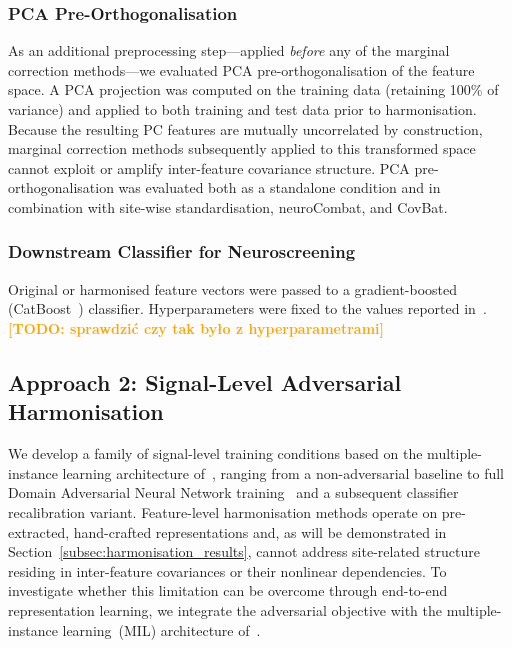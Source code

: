 \documentclass[preprint,12pt]{elsarticle}
\newcommand{\td}[1]{\textcolor{orange}{\textbf{[TODO: #1]}}}
\begin{document}
\subsubsection{PCA Pre-Orthogonalisation}
\label{subsubsec:pca}

As an additional preprocessing step---applied \emph{before} any of
the marginal correction methods---we evaluated PCA
pre-orthogonalisation of the feature space.
A PCA projection was computed on the training data (retaining 100\%
of variance) and applied to both training and test data prior to
harmonisation.
Because the resulting PC features are mutually uncorrelated by
construction, marginal correction methods subsequently applied to
this transformed space cannot exploit or amplify inter-feature
covariance structure.
PCA pre-orthogonalisation was evaluated both as a standalone
condition and in combination with site-wise standardisation,
neuroCombat, and CovBat.

\subsubsection{Downstream Classifier for Neuroscreening}
\label{subsubsec:classifier}

Original or harmonised feature vectors were passed to a
gradient-boosted (CatBoost~\cite{prokhorenkova2018catboost})
classifier.
Hyperparameters were fixed to the values reported
in~\cite{poziomska2026quantity}.
\td{sprawdzić czy tak było z hyperparametrami}

\subsection{Approach 2: Signal-Level Adversarial Harmonisation}
\label{sec:approach2}

We develop a family of signal-level training conditions based on the
multiple-instance learning architecture of~\cite{poziomska2026quantity},
ranging from a non-adversarial baseline to full Domain Adversarial
Neural Network training~\cite{ganin2016domain} and a subsequent
classifier recalibration variant.
Feature-level harmonisation methods operate on pre-extracted,
hand-crafted representations and, as will be demonstrated in
Section~\ref{subsec:harmonisation_results}, cannot address
site-related structure residing in inter-feature covariances or their
nonlinear dependencies.
To investigate whether this limitation can be overcome through
end-to-end representation learning, we integrate the adversarial
objective with the multiple-instance learning~(MIL) architecture
of~\cite{poziomska2026quantity}.
\end{document}
